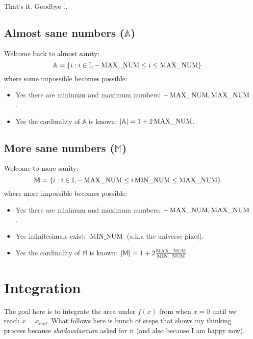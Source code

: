 \documentclass{report}
\DeclareMathOperator{\minnum}{MIN\_NUM}
\begin{document}
That's it. Goodbye $\mathbb{I}$.


\section{Almost sane numbers ($\mathbb{A}$)}
Welcome back to almost sanity:
\[
    \mathbb{A} = \{i : i \in \mathbb{I}, -\operatorname{MAX\_NUM} \le i \le \operatorname{MAX\_NUM}\}
\]
where some impossible becomes possible:
\begin{itemize}
    \item Yes there are minimum and maximum numbers: $-\operatorname{MAX\_NUM}, \operatorname{MAX\_NUM}$.
    \item Yes the cardinality of $\mathbb{A}$ is known: $|\mathbb{A}| = 1 +
    2\operatorname{MAX\_NUM}$.
\end{itemize}


\section{More sane numbers ($\mathbb{M}$)}
Welcome to more sanity:
\[
    \mathbb{M} = \{i : i \in \mathbb{I}, -\maxnum \le i\minnum \le \maxnum\}
\]
where more impossible becomes possible:
\begin{itemize}
    \item Yes there are minimum and maximum numbers: $-\operatorname{MAX\_NUM}, \operatorname{MAX\_NUM}$.
    \item Yes infinitesimals exist: $\minnum$ (a.k.a the universe pixel).
    \item Yes the cardinality of $\mathbb{M}$ is known: $|\mathbb{M}| = 1 +
    2\frac{\maxnum}{\minnum}$.
\end{itemize}



\chapter{Integration}
The goal here is to integrate the area under $f(x)$ from when $x = 0$ until we
reach $x = x_{end}$. What follows here is bunch of steps that shows my thinking
process because \emph{shadowdaemon} asked for it (and also because I am happy now).
\end{document}
